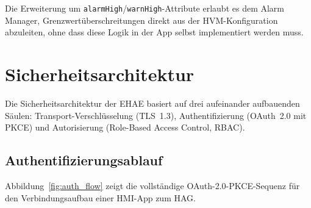 ﻿\documentclass[12pt,a4paper]{article}
\begin{document}
Die Erweiterung um \texttt{alarmHigh}/\texttt{warnHigh}-Attribute erlaubt es dem Alarm
Manager, Grenzwertüberschreitungen direkt aus der HVM-Konfiguration abzuleiten, ohne
dass diese Logik in der App selbst implementiert werden muss.

\section{Sicherheitsarchitektur}
\label{sec:security}

Die Sicherheitsarchitektur der EHAE basiert auf drei aufeinander aufbauenden Säulen:
Transport-Verschlüsselung (TLS~1.3), Authentifizierung (OAuth~2.0 mit PKCE) und
Autorisierung (Role-Based Access Control, RBAC).

\subsection{Authentifizierungsablauf}

Abbildung~\ref{fig:auth_flow} zeigt die vollständige OAuth-2.0-PKCE-Sequenz für den
Verbindungsaufbau einer HMI-App zum HAG.
\end{document}
